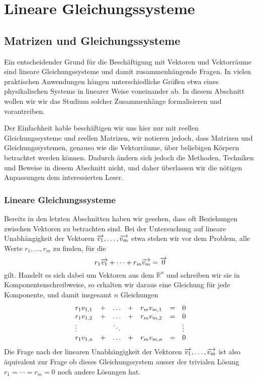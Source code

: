 
\chapter{Lineare Gleichungssysteme}

\section{Matrizen und Gleichungssysteme}\label{linalg_mat_gls}

Ein entscheidender Grund für die Beschäftigung mit Vektoren und Vektorräume sind lineare Gleichungssysteme 
und damit zusammenhängende Fragen. In vielen praktischen Anwendungen hängen unterschiedliche Größen
etwa eines physikalischen Systems in linearer Weise voneinander ab. In diesem Abschnitt wollen wir wir das 
Studium solcher Zusammenhänge formalisieren und vorantreiben. 

Der Einfachheit hable beschäftigen wir uns hier nur mit reellen Gleichungssysteme und reellen Matrizen, 
wir notieren jedoch, dass Matrizen und Gleichungssystemen, genauso wie die Vektorräume, über beliebigen 
Körpern betrachtet werden können. Dadurch ändern sich jedoch die Methoden, Techniken und Beweise in 
diesem Abschnitt nicht, und daher überlassen wir die nötigen Anpassungen dem interessierten Leser.  

\subsection{Lineare Gleichungssysteme}\label{section_lin_equ}

\setcounter{definition}{0}
\setcounter{beispiel}{0}
\setcounter{notiz}{0}


Bereits in den letzten Abschnitten haben wir gesehen, dass oft Beziehungen zwischen Vektoren zu betrachten sind.
Bei der Untersuchung auf lineare Unabhängigkeit der Vektoren $\overrightarrow{v_1}, \ldots ,\overrightarrow{v_m}$  
etwa stehen wir vor dem Problem, alle Werte $r_1, \ldots ,   r_m$ zu finden, für die 
  $$ r_1 \overrightarrow{v_1} + \cdots + r_m \overrightarrow{v_m} = \overrightarrow{0} $$
gilt. Handelt es sich dabei um Vektoren aus dem $\mathbb R^n$ und schreiben wir sie in Komponentenschreibweise, so 
erhalten wir daraus eine Gleichung für jede Komponente, und damit insgesamt $n$ Gleichungen
  $$ \begin{array}{l c c c l c l}
  r_1 v_{1,1} & + & \ldots & + & r_m v_{m,1} & = & 0 \\
  r_1 v_{1,2} & + & \ldots & + & r_m v_{m,2} & = & 0 \\  
  \vdots & & \ddots & & & & \vdots \\
  r_1 v_{1,n} & + & \ldots & + & r_m v_{m,n} & = & 0 
  \end{array} $$
Die Frage nach der linearen Unabhängigkeit der Vektoren $\overrightarrow{v_1}, 
\ldots ,\overrightarrow{v_m}$ ist 
also äquivalent zur Frage ob dieses Gleichungssystem ausser der trivialen Lösung 
$r_1 = \cdots = r_m = 0$ noch andere Lösungen hat. 

